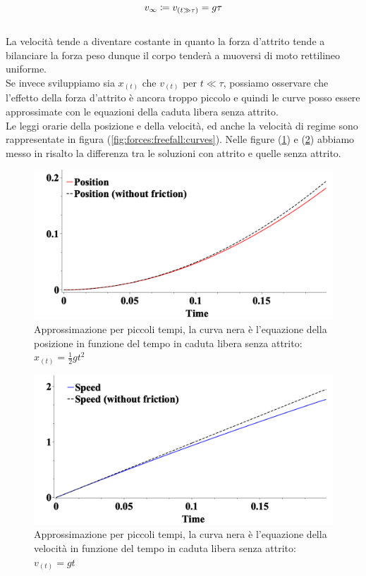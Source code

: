 \begin{equation}
    v_\infty\coloneqq v_{\left( t\gg\tau \right)} = g\tau
\label{eq:forces:viscous_vlim}
\end{equation}
\\
La velocità tende a diventare costante in quanto la forza d'attrito tende a
bilanciare la forza peso dunque il corpo tenderà a muoversi di moto
rettilineo uniforme.\\
Se invece sviluppiamo sia $x_{(t)}$ che $v_{(t)}$ per $t\ll\tau$,
possiamo osservare che l'effetto della forza d'attrito è ancora troppo
piccolo e quindi le curve posso essere approssimate con le equazioni della
caduta libera senza attrito.\\
Le leggi orarie della posizione e della velocità, ed anche la velocità di regime
sono rappresentate in figura (\ref{fig:forces:freefall:curves}). Nelle figure
(\ref{fig:freefall_approx_x}) e (\ref{fig:freefall_approx_v})
abbiamo messo in risalto la differenza tra le soluzioni con attrito e quelle
senza attrito.

\begin{figure}[htbp]
    \center
    \includegraphics[width=13cm]{images/freefallX.png}
    \caption{Approssimazione per piccoli tempi, la curva nera è l'equazione
    della posizione in funzione del tempo in caduta libera senza attrito:
    $x_{(t)} = \frac12gt^2$}
\label{fig:freefall_approx_x}
\end{figure}

\begin{figure}[htbp]
\center
    \includegraphics[width=13cm]{images/freefallV.png}
    \caption{Approssimazione per piccoli tempi, la curva nera è l'equazione
    della velocità in funzione del tempo in caduta libera senza attrito:
    $v_{(t)} = gt$}
\label{fig:freefall_approx_v}
\end{figure}

